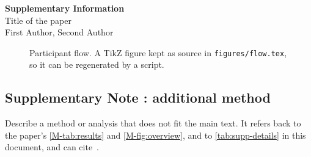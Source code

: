 \documentclass[10pt]{article}
\newcounter{suppnote}
\begin{document}
\begin{center}
{\Large\bfseries Supplementary Information}\\[1ex]
{\large Title of the paper}\\[1ex]
First Author, Second Author
\end{center}

\begin{figure}[htbp]
\centering

\caption{Participant flow. A TikZ figure kept as source in
\texttt{figures/flow.tex}, so it can be regenerated by a script.}
\label{fig:supp-flow}
\end{figure}



\label{note:supp-method}
\subsection*{Supplementary Note \thesuppnote: additional method}
Describe a method or analysis that does not fit the main text. It refers back
to the paper's \cref{M-tab:results} and \cref{M-fig:overview}, and to
\cref{tab:supp-details} in this document, and can cite~\cite{example2023book}.



\end{document}
